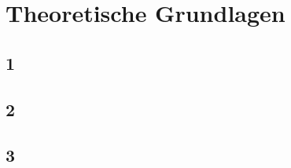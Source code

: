 \section{Theoretische Grundlagen} \label{sec:TheoretischeGrundlagen}

\subsection{1} \label{subsec:1}

\subsection{2} \label{subsec:2}

\subsection{3} \label{subsec:3}


\newpage









